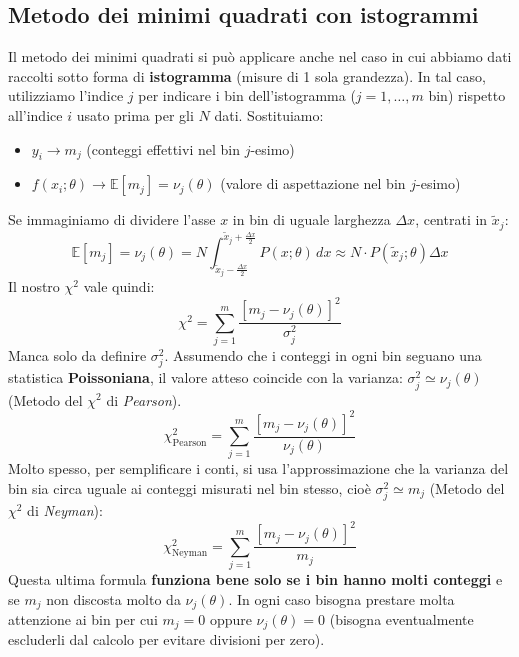 \documentclass[openany,a4paper,12pt]{book}
\theoremstyle{remark}
\begin{document}
\subsection*{Metodo dei minimi quadrati con istogrammi}
Il metodo dei minimi quadrati si può applicare anche nel caso in cui abbiamo dati raccolti sotto forma di \textbf{istogramma} (misure di 1 sola grandezza).
In tal caso, utilizziamo l'indice $j$ per indicare i bin dell'istogramma ($j=1, \dots, m$ bin) rispetto all'indice $i$ usato prima per gli $N$ dati.
Sostituiamo:
\begin{itemize}
    \item $y_i \longrightarrow m_j$ (conteggi effettivi nel bin $j$-esimo)
    \item $f(x_i; \theta) \longrightarrow \mathbb{E}[m_j] = \nu_j(\theta)$ (valore di aspettazione nel bin $j$-esimo)
\end{itemize}
Se immaginiamo di dividere l'asse $x$ in bin di uguale larghezza $\Delta x$, centrati in $\tilde{x}_j$:
\begin{equation}
    \mathbb{E}[m_j] = \nu_j(\theta) = N \int_{\tilde{x}_j - \frac{\Delta x}{2}}^{\tilde{x}_j + \frac{\Delta x}{2}} P(x; \theta) \, dx \approx N \cdot P(\tilde{x}_j; \theta) \Delta x
\end{equation}
Il nostro $\chi^2$ vale quindi:
\begin{equation}
    \chi^2 = \sum_{j=1}^m \frac{[m_j - \nu_j(\theta)]^2}{\sigma_j^2}
\end{equation}
Manca solo da definire $\sigma_j^2$. Assumendo che i conteggi in ogni bin seguano una statistica \textbf{Poissoniana}, il valore atteso coincide con la varianza: $\sigma_j^2 \simeq \nu_j(\theta)$ (Metodo del $\chi^2$ di \textit{Pearson}).
\begin{equation}
    \chi^2_{\text{Pearson}} = \sum_{j=1}^m \frac{[m_j - \nu_j(\theta)]^2}{\nu_j(\theta)}
\end{equation}
Molto spesso, per semplificare i conti, si usa l'approssimazione che la varianza del bin sia circa uguale ai conteggi misurati nel bin stesso, cioè $\sigma_j^2 \simeq m_j$ (Metodo del $\chi^2$ di \textit{Neyman}):
\begin{equation}
    \chi^2_{\text{Neyman}} = \sum_{j=1}^m \frac{[m_j - \nu_j(\theta)]^2}{m_j}
\end{equation}
Questa ultima formula \textbf{funziona bene solo se i bin hanno molti conteggi} e se $m_j$ non discosta molto da $\nu_j(\theta)$. In ogni caso bisogna prestare molta attenzione ai bin per cui $m_j = 0$ oppure $\nu_j(\theta)=0$ (bisogna eventualmente escluderli dal calcolo per evitare divisioni per zero).
\end{document}
